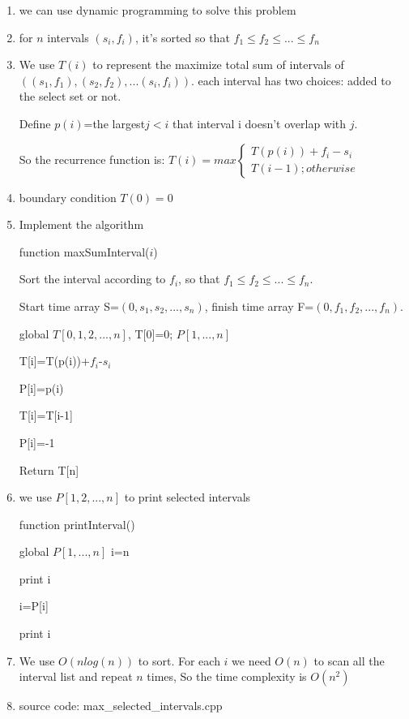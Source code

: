 \documentclass[12pt]{article}
\begin{document}
\begin{enumerate}
\item  we can use dynamic programming to solve this problem
\item for $n$ intervals $(s_i,f_i)$, it's sorted so that $f_1 \leq f_2 \leq ... \leq f_n$
\item We use $T(i)$ to represent the maximize total sum of intervals of $((s_1,f_1),(s_2,f_2),...(s_i,f_i))$. 
each interval has two choices: added to the select set or not.

 Define $p(i)$=the largest$ j<i$ that interval i doesn't overlap with $j$.

 So the recurrence function is:
$T(i)=max
\begin{cases}
T(p(i))+f_i-s_i \\
T(i-1); otherwise
\end{cases}
$
\item boundary condition $T(0)=0$
\item Implement the algorithm
\begin{algorithm}[H]
\caption{function maxSumInterval($i$) }

Sort the interval according to $f_i$, so that $f_1 \leq f_2 \leq ... \leq f_n$.

Start time array S=$(0,s_1,s_2,...,s_n)$, finish time array F=$(0,f_1,f_2,...,f_n)$.
\begin{algorithmic}[1]
\State global $T[0,1,2,...,n]$, T[0]=0; $P[1,...,n]$
\State 
{}

T[i]=T(p(i))+$f_i$-$s_i$

P[i]=p(i)
\Else

T[i]=T[i-1]

P[i]=-1

\EndIf
\EndFor
\State Return T[n]
\end{algorithmic}
\end{algorithm}
\item we use $P[1,2,...,n]$ to print selected intervals

\begin{algorithm}[H]
\caption{function printInterval() }
\begin{algorithmic}[1]
\State global $P[1,...,n]$
\State i=n

print i


i=P[i]

\EndIf
\EndWhile

\State print i

\end{algorithmic}
\end{algorithm}
\item We use $O(nlog(n))$ to sort. For each $i$ we need $O(n)$ to scan all the interval list and repeat $n$ times, So the time complexity is $O(n^2)$
\item source code: max\_selected\_intervals.cpp
\end{enumerate}
 
\end{document}

